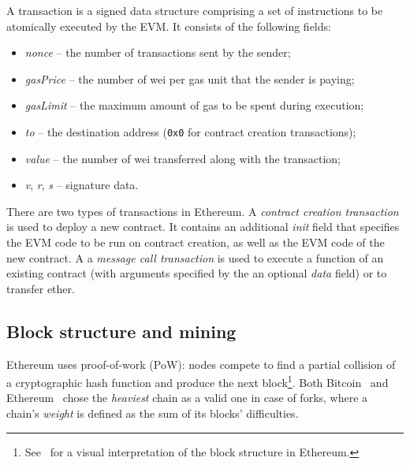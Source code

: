 A transaction is a signed data structure comprising a set of instructions to be atomically executed by the EVM.
It consists of the following fields:
\begin{itemize}
	\item \emph{nonce} -- the number of transactions sent by the sender;
	\item \emph{gasPrice} -- the number of wei per gas unit that the sender is paying;
	\item \emph{gasLimit} -- the maximum amount of gas to be spent during execution;
	\item \emph{to} -- the destination address (\texttt{0x0} for contract creation transactions);
	\item \emph{value} -- the number of wei transferred along with the transaction;
	\item \emph{v}, \emph{r}, \emph{s} -- signature data.
\end{itemize}

There are two types of transactions in Ethereum.
A \emph{contract creation transaction} is used to deploy a new contract.
It contains an additional \emph{init} field that specifies the EVM code to be run on contract creation, as well as the EVM code of the new contract.
A a \emph{message call transaction} is used to execute a function of an existing contract (with arguments specified by the an optional \emph{data} field) or to transfer ether.


\subsection{Block structure and mining}
Ethereum uses proof-of-work (PoW): nodes compete to find a partial collision of a cryptographic hash function and produce the next block\footnote{See~\cite{atomh33ls16} for a visual interpretation of the block structure in Ethereum.}.
Both Bitcoin~\cite{Wuille2017} and Ethereum~\cite{Johnson2017} chose the \textit{heaviest} chain as a valid one in case of forks, where a chain's \textit{weight} is defined as the sum of its blocks' difficulties.

